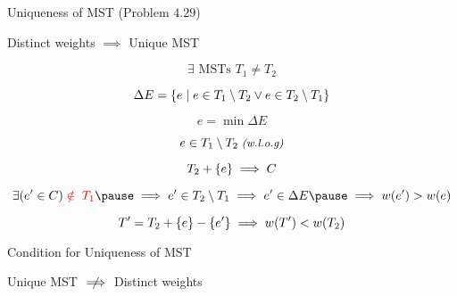 
\begin{frame}{}
  \centerline{}
\end{frame}

\begin{frame}{}
  \begin{exampleblock}{Uniqueness of MST (Problem $4.29$)}
    \centerline{Distinct weights $\implies$ Unique MST}
  \end{exampleblock}

  \pause
  \vspace{0.50cm}
  \centerline{}

  \pause
  \[
    \exists \text{ MSTs } T_1 \neq T_2
  \]

  \pause
  \[
    \Delta E = \left\{e \mid e \in T_1 \setminus T_2 \lor e \in T_2 \setminus T_1\right\}
  \]

  \pause
  \[
    e = \min \Delta E
  \]

  \pause
  \[
    e \in T_1 \setminus T_2 \;\text{\small \it (w.l.o.g)}
  \]
\end{frame}

\begin{frame}{}

  \pause
  \vspace{-0.30cm}
  \[
    T_2 + \left\{e\right\} \implies C
  \]

  \pause
  \vspace{-0.30cm}
  \[
    \exists (e' \in C) \red{\;\notin\; T_1} \pause \implies e' \in T_{2} \setminus T_{1} \implies e' \in \Delta E \pause \implies w(e') > w(e)
  \]

  \pause
  \vspace{-0.50cm}
  \[
    T' = T_{2} + \left\{e\right\} - \left\{e'\right\} \implies w(T') < w(T_{2})
  \]
\end{frame}

\begin{frame}{}
  \begin{exampleblock}{Condition for Uniqueness of MST}
    \centerline{Unique MST $\centernot\implies$ Distinct weights}
  \end{exampleblock}

  \pause
\end{frame}

